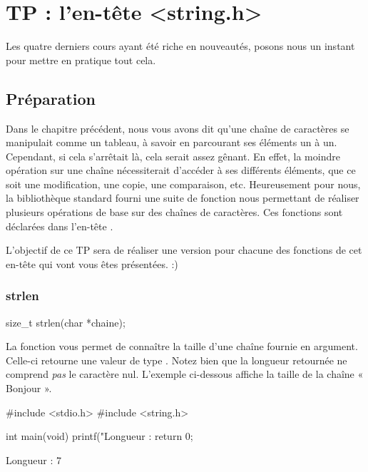 \chapter{TP : l'en-tête <string.h>}
\label{tp-:-len-tete-<string.h>}

Les quatre derniers cours ayant été riche en nouveautés, 
posons nous un instant pour mettre en pratique tout cela.

\section{Préparation }
\label{preparation }

Dans le chapitre précédent, nous vous avons dit qu'une chaîne de caractères
se manipulait comme un tableau, à savoir en parcourant ses éléments un à
un. Cependant, si cela s'arrêtait là, cela serait assez gênant. En
effet, la moindre opération sur une chaîne nécessiterait d'accéder à ses
différents éléments, que ce soit une modification, une copie, une
comparaison, etc. Heureusement pour nous, la bibliothèque standard
fourni une suite de fonction nous permettant de réaliser plusieurs
opérations de base sur des chaînes de caractères. Ces fonctions sont
déclarées dans l'en-tête .

L'objectif de ce TP sera de réaliser une version pour chacune des
fonctions de cet en-tête qui vont vous êtes présentées. :)

\subsection{strlen}
\label{strlen-1}

\begin{C}
size_t strlen(char *chaine);
\end{C}

La fonction  vous permet de connaître la taille d'une
chaîne fournie en argument. Celle-ci retourne une valeur de type
. Notez bien que la longueur retournée ne comprend
\emph{pas} le caractère nul. L'exemple ci-dessous affiche la taille de
la chaîne « Bonjour ».

\begin{C}
#include <stdio.h>
#include <string.h>


int main(void)
{
    printf("Longueur : %
    return 0;
}
\end{C}

\begin{C}
Longueur : 7
\end{C}


